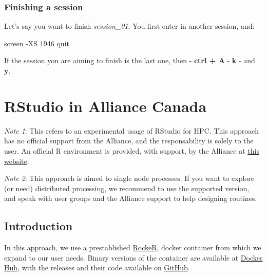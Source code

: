 \documentclass[
]{book}
\newenvironment{Shaded}{\begin{snugshade}}{\end{snugshade}}
\newcommand{\AttributeTok}[1]{\textcolor[rgb]{0.77,0.63,0.00}{#1}}
\newcommand{\ExtensionTok}[1]{#1}
\newcommand{\NormalTok}[1]{#1}
\begin{document}
\hypertarget{finishing-a-session}{%
\subsection{Finishing a session}\label{finishing-a-session}}

Let's say you want to finish \emph{session\_01}. You first enter in another session, and:

\begin{Shaded}
\begin{Highlighting}[]
\ExtensionTok{screen} \AttributeTok{{-}XS}\NormalTok{ 1946 quit}
\end{Highlighting}
\end{Shaded}

If the session you are aiming to finish is the last one, then
- \textbf{ctrl + A}
- \textbf{k}
- and \textbf{y}.

\hypertarget{rstudio-in-alliance-canada}{%
\chapter{RStudio in Alliance Canada}\label{rstudio-in-alliance-canada}}

\emph{Note 1}: This refers to an experimental usage of RStudio for HPC. This approach
has no official support from the Alliance, and the responsability is solely to
the user. An official R environment is provided, with support, by the Alliance at
\href{https://docs.alliancecan.ca/wiki/Technical_documentation}{this website}.

\emph{Note 2}: This approach is aimed to single node processes. If you want to
explore (or need) distributed processing, we recommend to use the supported
version, and speak with user groups and the Alliance support to help designing routines.

\hypertarget{introduction}{%
\section{Introduction}\label{introduction}}

In this approach, we use a prestablished \href{https://rocker-project.org/}{RockeR},
docker container from which we expand to our user needs. Binary versions of the
container are available at \href{https://hub.docker.com/repository/docker/ricardobarroslourenco/rstudio_container/general}{Docker Hub}, with the releases and their code available on \href{https://github.com/MacRemoteSensing/rstudio_container/releases}{GitHub}.
\end{document}
